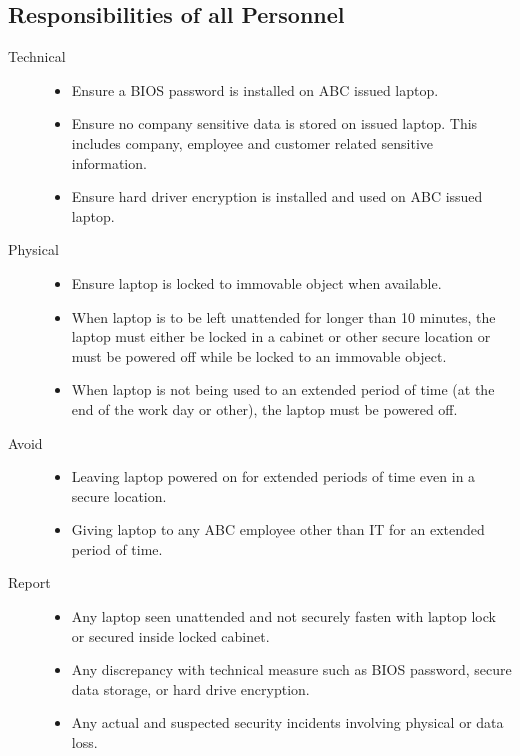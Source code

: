\documentclass[DIV=calc, paper=a4, fontsize=11pt, twocolumn]{scrartcl}	 %
\begin{document}

\subsection*{Responsibilities of all Personnel}

\begin{description}
  \item[Technical] \hfill
    \begin{itemize}
    \item Ensure a BIOS password is installed on ABC issued laptop.
    \item Ensure no company sensitive data is stored on issued laptop. This
    includes company, employee and customer related sensitive information.
    \item Ensure hard driver encryption is installed and used on 
    ABC issued laptop.
    \end{itemize}
  \item[Physical] \hfill
    \begin{itemize}
    \item Ensure laptop is locked to immovable object when available.
    \item When laptop is to be left unattended for longer than 10 minutes,
    the laptop must either be locked in a cabinet or other secure location
    or must be powered off while be locked to an immovable object.
    \item When laptop is not being used to an extended period of time (at the
    end of the work day or other), the laptop must be powered off.
    \end{itemize}
  \item[Avoid] \hfill
   \begin{itemize}
    \item Leaving laptop powered on for extended periods of time even in
    a secure location.
    \item Giving laptop to any ABC employee other than IT for an extended
    period of time.
    \end{itemize}
  \item[Report] \hfill
   \begin{itemize}
    \item Any laptop seen unattended and not securely fasten with laptop 
    lock or secured inside locked cabinet. 
    \item Any discrepancy with technical measure such as BIOS password,
    secure data storage, or hard drive encryption.
    \item Any actual and suspected security incidents involving physical
    or data loss.
    \end{itemize}
\end{description}
\end{document}
